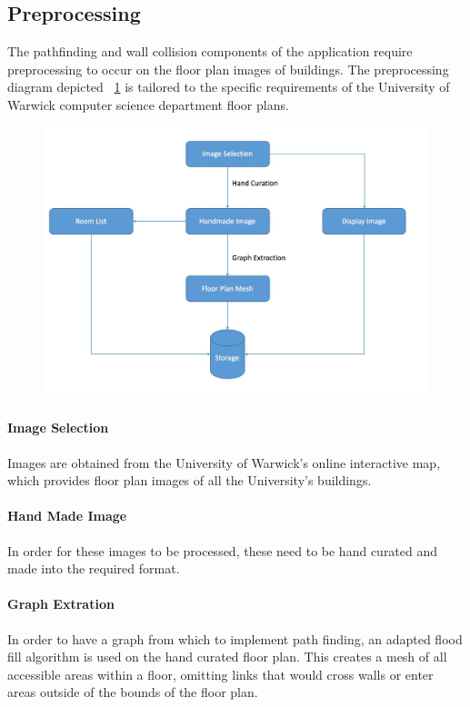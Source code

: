 \documentclass[12pt,a4paper]{report}
\begin{document}
\subsection{Preprocessing}

The pathfinding and wall collision components of the application require preprocessing to occur on the floor plan images of buildings. The preprocessing diagram depicted ~\ref{fig:preFlow} is tailored to the specific requirements of the University of Warwick computer science department floor plans.

\begin{figure}[h]
\includegraphics[width=\textwidth]{images/preFlow.png}
\label{fig:preFlow}
\end{figure}

\paragraph{Image Selection}
Images are obtained from the University of Warwick's online interactive map, which provides floor plan images of all the University's buildings.

\paragraph{Hand Made Image}
In order for these images to be processed, these need to be hand curated and made into the required format.

\paragraph{Graph Extration}
In order to have a graph from which to implement path finding, an adapted flood fill algorithm is used on the hand curated floor plan. This creates a mesh of all accessible areas within a floor, omitting links that would cross walls or enter areas outside of the bounds of the floor plan.
\end{document}
